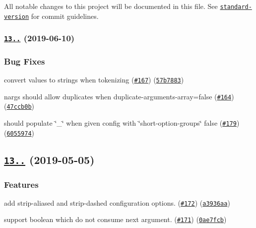 All notable changes to this project will be documented in this file. See \href{https://github.com/conventional-changelog/standard-version}{\tt standard-\/version} for commit guidelines.

\subsubsection*{\href{https://www.github.com/yargs/yargs-parser/compare/v13.1.0...v13.1.1}{\tt 13..} (2019-\/06-\/10)}

\subsubsection*{Bug Fixes}


\begin{DoxyItemize}
\item convert values to strings when tokenizing (\href{https://www.github.com/yargs/yargs-parser/issues/167}{\tt \#167}) (\href{https://www.github.com/yargs/yargs-parser/commit/57b7883}{\tt 57b7883})
\item nargs should allow duplicates when duplicate-\/arguments-\/array=false (\href{https://www.github.com/yargs/yargs-parser/issues/164}{\tt \#164}) (\href{https://www.github.com/yargs/yargs-parser/commit/47ccb0b}{\tt 47ccb0b})
\item should populate \char`\"{}\+\_\+\char`\"{} when given config with \char`\"{}short-\/option-\/groups\char`\"{} false (\href{https://www.github.com/yargs/yargs-parser/issues/179}{\tt \#179}) (\href{https://www.github.com/yargs/yargs-parser/commit/6055974}{\tt 6055974})
\end{DoxyItemize}

\subsection*{\href{https://github.com/yargs/yargs-parser/compare/v13.0.0...v13.1.0}{\tt 13..} (2019-\/05-\/05)}

\subsubsection*{Features}


\begin{DoxyItemize}
\item add {\ttfamily strip-\/aliased} and {\ttfamily strip-\/dashed} configuration options. (\href{https://github.com/yargs/yargs-parser/issues/172}{\tt \#172}) (\href{https://github.com/yargs/yargs-parser/commit/a3936aa}{\tt a3936aa})
\item support boolean which do not consume next argument. (\href{https://github.com/yargs/yargs-parser/issues/171}{\tt \#171}) (\href{https://github.com/yargs/yargs-parser/commit/0ae7fcb}{\tt 0ae7fcb})
\end{DoxyItemize}

